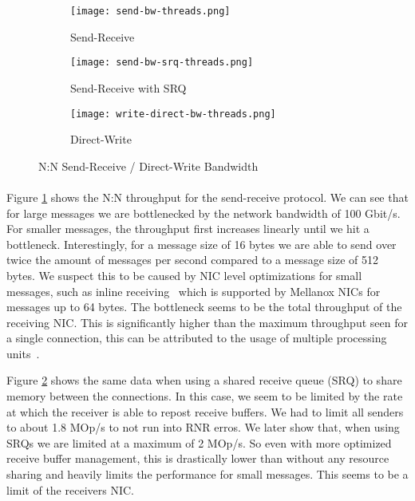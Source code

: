 \begin{figure}[ht]
  \centering
\begin{subfigure}[b]{0.49\textwidth}
  \centering
  \texttt{[image: send-bw-threads.png]}
  \caption{Send-Receive}
  \label{fig:plot-sndrcv-bw-thread-nosrq}
\end{subfigure}
\begin{subfigure}[b]{0.49\textwidth}
  \centering
  \texttt{[image: send-bw-srq-threads.png]}
  \caption{Send-Receive with SRQ}
  \label{fig:plot-sndrcv-bw-thread-srq}
\end{subfigure}
  \begin{subfigure}[b]{0.48\textwidth}
  \centering
  \texttt{[image: write-direct-bw-threads.png]}
  \caption{Direct-Write}
  \label{fig:plot-wdir-bw-threads}
  \end{subfigure}
\caption{N:N Send-Receive / Direct-Write Bandwidth}
  \label{fig:plot-sndrcv-bw-thread}
\end{figure}


\paragraph{} Figure \ref{fig:plot-sndrcv-bw-thread-nosrq} shows the N:N throughput for the send-receive protocol.
We can see that for large messages we are bottlenecked by the network bandwidth of 100 Gbit/s. For smaller
messages, the throughput first increases linearly until we hit a bottleneck. Interestingly, for a message size 
of 16 bytes we are able to send over twice the amount of messages per second compared to a message size of 512 bytes.
We suspect this to be caused by NIC level optimizations for small messages, such as inline receiving~\cite{anuj-guide} which 
is supported by Mellanox NICs for messages up to 64 bytes. The bottleneck seems to be the total throughput of the 
receiving NIC. This is significantly higher than the maximum throughput seen for a single connection, this can be 
attributed to the usage of multiple processing units~\cite{anuj-guide}.


Figure \ref{fig:plot-sndrcv-bw-thread-srq} shows the same data when using a shared receive queue (SRQ) to share memory
between the connections. In this case, we seem to be limited by the rate at which the receiver is able to
repost receive buffers. We
had to limit all senders to about 1.8 MOp/s to not run into RNR erros.
We later show that, when using SRQs we are limited at a maximum of 2 MOp/s. So even with more optimized receive buffer management,
this is drastically lower than without any resource sharing and heavily limits the performance for small messages. This seems
to be a limit of the receivers NIC.

